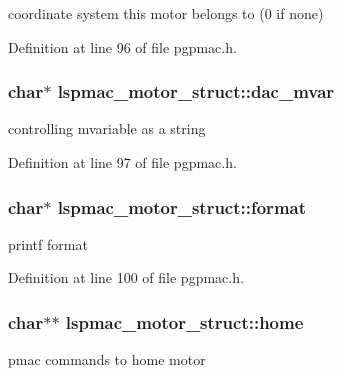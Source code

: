 coordinate system this motor belongs to (0 if none) 



Definition at line 96 of file pgpmac.\-h.

\hypertarget{structlspmac__motor__struct_a05dff021221abbc1bf656039fffb3275}{
\subsubsection[{dac\-\_\-mvar}]{\setlength{\rightskip}{0pt plus 5cm}char$\ast$ lspmac\-\_\-motor\-\_\-struct\-::dac\-\_\-mvar}}\label{structlspmac__motor__struct_a05dff021221abbc1bf656039fffb3275}


controlling mvariable as a string 



Definition at line 97 of file pgpmac.\-h.

\hypertarget{structlspmac__motor__struct_aba3d9d00271187128506bbbb1d77da19}{
\subsubsection[{format}]{\setlength{\rightskip}{0pt plus 5cm}char$\ast$ lspmac\-\_\-motor\-\_\-struct\-::format}}\label{structlspmac__motor__struct_aba3d9d00271187128506bbbb1d77da19}


printf format 



Definition at line 100 of file pgpmac.\-h.

\hypertarget{structlspmac__motor__struct_a073246b8878d75615b0536301b343f3d}{
\subsubsection[{home}]{\setlength{\rightskip}{0pt plus 5cm}char$\ast$$\ast$ lspmac\-\_\-motor\-\_\-struct\-::home}}\label{structlspmac__motor__struct_a073246b8878d75615b0536301b343f3d}


pmac commands to home motor 



